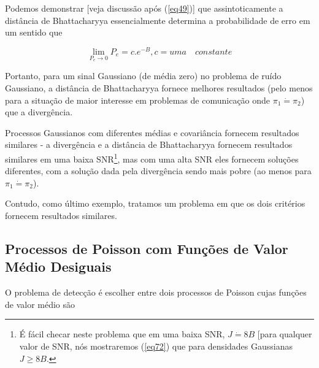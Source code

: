 \documentclass{sbrt2017port}
\begin{document}
Podemos demonstrar [veja discussão após (\ref{eq49})] que assintoticamente a distância de Bhattacharyya essencialmente determina a probabilidade de erro em um sentido que


$$ \lim_{P_e\rightarrow 0} P_e = c . e^{-B}, c = uma \quad constante $$

Portanto, para um sinal Gaussiano (de média zero) no problema de ruído Gaussiano, a distância de Bhattacharyya fornece melhores resultados (pelo menos para a situação de maior interesse em problemas de comunicação onde $\pi_1 \dot{=} \pi_2$) que a divergência.

Processos Gaussianos com diferentes médias e covariância fornecem resultados similares - a divergência e a distância de Bhattacharyya fornecem resultados similares em uma baixa SNR\footnote[8]{É fácil checar neste problema que em uma baixa SNR, $J \dot{=} 8B $ [para qualquer valor de SNR, nós mostraremos (\ref{eq72}) que para densidades Gaussianas $ J \geq 8B $.}, mas com uma alta SNR eles fornecem soluções diferentes, com a solução dada pela divergência sendo mais pobre (ao menos para $\pi_1 \dot{=} \pi_2$).

Contudo, como último exemplo, tratamos um problema em que os dois critérios fornecem resultados similares.

\subsection{Processos de Poisson com Funções de Valor Médio Desiguais}

O problema de detecção é escolher entre dois processos de Poisson cujas funções de valor médio são
\end{document}

